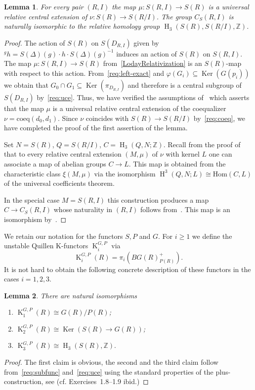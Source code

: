 \documentclass[oneside, 8pt]{amsart}
\newtheorem{lemma}{Lemma}
\theoremstyle{remark}
\theoremstyle{definition}
\numberwithin{lemma}{section}
\numberwithin{prop}{section}
\numberwithin{corollary}{section}
\numberwithin{externaltheorem}{section}
\DeclareMathOperator{\Ker}{Ker}
\DeclareMathOperator{\HH}{H}
\DeclareMathOperator{\K}{K}
\newcommand{\ZZ}{\mathbb{Z}}
\numberwithin{equation}{section}
\begin{document}
\begin{lemma}\label{lem:relativeH3}
 For every pair $(R, I)$ the map $\mu \colon S(R, I) \to S(R)$ is a universal relative central extension of $\nu \colon S(R) \to S(R/I)$. The group $C_S(R, I)$ is naturally isomorphic to the relative homology group $\HH_3(S(R), S(R/I), \ZZ)$.
\end{lemma}
\begin{proof}
The action of $S(R)$ on $S(D_{R, I})$ given by ${}^g h = S(\Delta)(g) \cdot h \cdot S(\Delta)(g)^{-1}$ induces an action of $S(R)$ on $S(R, I)$.
The map $\mu \colon S(R, I) \to S(R)$ from~\eqref{LodayRelativization} is an $S(R)$-map with respect to this action.
From~\ref{req:left-exact} and $\varphi(G_i) \subseteq \Ker(G(p_i))$ we obtain that 
$G_0 \cap G_1 \subseteq \Ker(\pi_{D_{R, I}})$ and therefore is a central subgroup of $S(D_{R,I})$ by~\ref{req:uce}. Thus, we have verified the assumptions of~\cite[Proposition~6]{Lo78} which asserts that the map $\mu$ is a universal relative central extension of the coequalizer $\nu = \mathrm{coeq}(d_0, d_1)$. Since $\nu$ coincides with $S(R) \to S(R/I)$ by~\ref{req:coeq}, we have completed the proof of the first assertion of the lemma.

Set $N = S(R)$, $Q = S(R/I)$, $C = \HH_3(Q, N; \ZZ)$. Recall from the proof of~\cite[Th{\'e}or{\`e}me~2]{Lo78} that to every relative central extension $(M, \mu)$ of $\nu$ with kernel $L$ one can associate a map of abelian groups $C \to L$. This map is obtained from the characteristic class $\xi(M, \mu)$ via the isomorphism $\HH^3(Q, N; L) \cong \mathrm{Hom}(C, L)$ of the universal coefficients theorem.

In the special case $M = S(R, I)$ this construction produces a map $C \to C_{S}(R, I)$ whose naturality in $(R, I)$ follows from~\cite[Proposition~3]{Lo78}. 
This map is an isomorphism by~\cite[Th{\'e}or{\`e}me~2]{Lo78}. \end{proof}

We retain our notation for the functors $S, P$ and $G$.
For $i\geq 1$ we define the unstable Quillen K-functors $\K_{i}^{G, P}$ via
\begin{equation} \label{plus-constr} \K_i^{G,P}(R) = \pi_i(BG(R)^+_{P(R)}). \end{equation}
It is not hard to obtain the following concrete description of these functors in the cases $i=1,2,3$.
\begin{lemma}\label{lem:lowerKgroups} There are natural isomorphisms \begin{enumerate}
 \item $\K_1^{G,P}(R) \cong G(R) / P(R)$;
 \item $\K_2^{G,P}(R) \cong \Ker(S(R) \to G(R))$;
 \item $\K_3^{G,P}(R) \cong \HH_3(S(R), \ZZ).$ \end{enumerate} \end{lemma}
\begin{proof} The first claim is obvious, the second and the third claim follow from~\ref{req:subfunc} and~\ref{req:uce} using the standard properties of the plus-construction, see \cite[\S~IV.1]{Kbook}   (cf. Exercises~1.8--1.9 ibid.) \end{proof}
\end{document}
